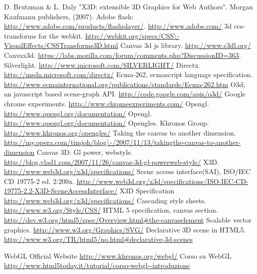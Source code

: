  D. Brutzman \& L. Daly "X3D: extensible 3D Graphics for Web Authors". Morgan Kaufmann publishers, (2007).
 Adobe flash: \url{http://www.adobe.com/products/flashplayer/}.
 \url{http://www.adobe.com/}
 3d ccs-transforms for the webkit. \url{http://webkit.org/specs/CSS\-VisualEffects/CSSTransforms3D.html}
 Canvas 3d js library. \url{http://www.c3dl.org/}
 Canvax3d. \url{https://labs.mozilla.com/forum/comments.php?DiscussionID=363}.
 Silverlight. \url{http://www.microsoft.com/SILVERLIGHT/}
 Directx. \url{http://msdn.microsoft.com/directx/}
 Ecma-262, ecmascript language specification. \url{http://www.ecmainternational.org/publications/standards/Ecma-262.htm}
 O3d; an javascript based scene-graph API. \url{http://code.google.com/apis/o3d/}
 Google chrome experiments. \url{http://www.chromeexperiments.com/}
 Opengl. \url{http://www.opengl.org/documentation/}
 Opengl. \url{http://www.opengl.org/documentation/}
 Opengles. Khronos Group. \url{http://www.khronos.org/opengles/}
 Taking the canvas to another dimension. \url{http://my.opera.com/timjoh/blog\-/2007/11/13/takingthe-canvas-to-another-dimension}
 Canvas 3D: Gl power, webstyle. \url{http://blog.vlad1.com/2007/11/26/canvas-3d-gl-powerweb-style/}
 X3D. \url{http://www.web3d.org/x3d/specifications/}
 Scene access interface(SAI), ISO/IEC CD 19775-2 ed. 2:200x. \url{http://www.web3d.org/x3d/specifications/ISO-IEC-CD-19775-2.2-X3D-SceneAccessInterface/}
 X3D Specification \url{http://www.web3d.org/x3d/specifications/}
 Cascading style sheets. \url{http://www.w3.org/Style/CSS/}
 HTML 5 specification, canvas section. \url{http://dev.w3.org/html5/spec/Overview.html\#the-canvaselement}
 Scalable vector graphics. \url{http://www.w3.org/Graphics/SVG/}
 Declarative 3D scene in HTML5. \url{http://www.w3.org/TR/html5/no.html\#declarative-3d-scenes}

 WebGL Official Website \url{http://www.khronos.org/webgl/}
 Corso su WebGL \url{http://www.html5today.it/tutorial/corso-webgl--introduzione}


